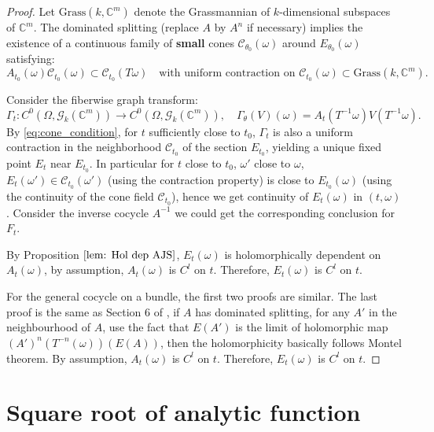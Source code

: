\documentclass[11pt]{amsart}
\theoremstyle{remark}
\theoremstyle{definition}
\begin{document}
\begin{proof}




Let $\mathrm{Grass}(k,\mathbb{C}^m)$ denote the Grassmannian of $k$-dimensional subspaces of $\mathbb{C}^m$. The dominated splitting (replace $A$ by $A^n$ if necessary) implies the existence of a continuous family of \textbf{small} cones $\mathcal{C}_{\theta_0}(\omega)$ around $E_{\theta_0}(\omega)$ satisfying:
\begin{equation}\label{eq:cone_condition}
A_{t_0}(\omega)\mathcal{C}_{t_0}(\omega) \subset \mathcal{C}_{t_0}(T\omega) \quad \text{with uniform contraction on } \mathcal{C}_{t_0}(\omega)\subset \mathrm{Grass}(k,\mathbb{C}^m).
\end{equation}

Consider the fiberwise graph transform:
    \[
    \Gamma_t: C^0(\Omega, \mathcal{G}_k(\mathbb{C}^m)) \to C^0(\Omega, \mathcal{G}_k(\mathbb{C}^m)), \quad \Gamma_\theta(V)(\omega) = A_t(T^{-1}\omega)V(T^{-1}\omega).
    \]
    By \eqref{eq:cone_condition},  for $t$ sufficiently close to $t_0$, $\Gamma_t$ is also a  uniform contraction in the neighborhood $\mathcal C_{t_0}$ of the section $E_{t_0}$, yielding a unique fixed point $E_{t}$ near $E_{t_0}$. 
    In particular for $t$ close to $t_0$, $\omega'$ close to $\omega$, $E_{t}(\omega')\in \mathcal C_{t_0}(\omega')$ (using the contraction property) is close to $E_{t_0}(\omega)$ (using the continuity of the cone field $\mathcal C_{t_0}$), hence we get continuity of $E_t(\omega)$ in $(t,\omega)$. Consider the inverse cocycle $A^{-1}$ we could get the corresponding conclusion for $F_t$.

 By Proposition $\ref{lem: Hol dep AJS}$, $E_t(\omega)$ is holomorphically dependent on $A_t(\omega)$, by assumption, $A_t(\omega)$ is $C^l$  on $t$. Therefore, $E_t(\omega)$ is $C^l$  on $t$.

For the general cocycle on a bundle, the first two proofs are similar. The last proof is the same as Section 6 of \cite{AJS},  if $A$ has dominated splitting, for any $A'$ in the neighbourhood of $A$,  use the fact that $E(A')$ is the limit of holomorphic map $(A')^n(T^{-n}(\omega))(E(A))$, then the holomorphicity basically follows Montel theorem. By assumption, $A_t(\omega)$ is $C^l$  on $t$. Therefore, $E_t(\omega)$ is $C^l$  on $t$.
\end{proof}
\section{Square root of analytic function}
\end{document}
